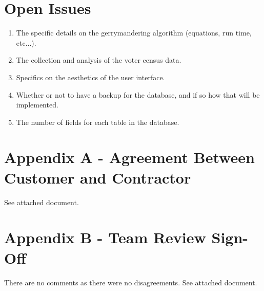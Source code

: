 \documentclass{article}
\begin{document}

\section{Open Issues}\label{sec:openIssues}

\vspace{2.5mm}

\begin{addmargin}[2em]{0em}

\begin{enumerate}

\item The specific details on the gerrymandering algorithm (equations, run time, etc...).
\item The collection and analysis of the voter census data.
\item Specifics on the aesthetics of the user interface.
\item Whether or not to have a backup for the database, and if so how that will be implemented.
\item The number of fields for each table in the database.

\end{enumerate}
\end{addmargin}


\section{Appendix A - Agreement Between Customer and Contractor}\label{sec:apendixA}

\vspace{2.5mm}

\begin{addmargin}[2em]{0em}

See attached document.

\end{addmargin}

\section{Appendix B - Team Review Sign-Off}\label{sec:appendixB}

\vspace{2.5mm}

\begin{addmargin}[2em]{0em}

There are no comments as there were no disagreements. See attached document.

\end{addmargin}
\end{document}
